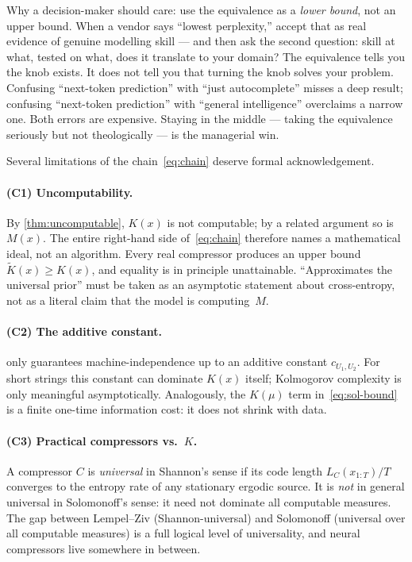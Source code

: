 \documentclass[12pt,a4paper]{article}
\theoremstyle{plain}
\theoremstyle{definition}
\begin{document}
\begin{intuition}
Why a decision-maker should care: use the equivalence as a
\emph{lower bound}, not an upper bound.  When a vendor says ``lowest
perplexity,'' accept that as real evidence of genuine modelling skill
--- and then ask the second question: skill at what, tested on what,
does it translate to your domain?  The equivalence tells you the knob
exists.  It does not tell you that turning the knob solves your
problem.  Confusing ``next-token prediction'' with ``just autocomplete''
misses a deep result; confusing ``next-token prediction'' with
``general intelligence'' overclaims a narrow one.  Both errors are
expensive.  Staying in the middle --- taking the equivalence seriously
but not theologically --- is the managerial win.
\end{intuition}

Several limitations of the chain~\eqref{eq:chain} deserve formal
acknowledgement.

\paragraph{(C1) Uncomputability.}
By \cref{thm:uncomputable}, $K(x)$ is not computable; by a related
argument so is $M(x)$.  The entire right-hand side of~\eqref{eq:chain}
therefore names a mathematical ideal, not an algorithm.  Every real
compressor produces an upper bound $\tilde K(x) \ge K(x)$, and
equality is in principle unattainable.  ``Approximates the universal
prior'' must be taken as an asymptotic statement about cross-entropy,
not as a literal claim that the model is computing~$M$.

\paragraph{(C2) The additive constant.}
 only guarantees machine-independence up to an
additive constant $c_{U_1, U_2}$.  For short strings this constant
can dominate $K(x)$ itself; Kolmogorov complexity is only meaningful
asymptotically.  Analogously, the $K(\mu)$ term in~\eqref{eq:sol-bound}
is a finite one-time information cost: it does not shrink with data.

\paragraph{(C3) Practical compressors vs.\ $K$.}
A compressor $C$ is \emph{universal} in Shannon's sense if its code
length $L_C(x_{1:T})/T$ converges to the entropy rate of any
stationary ergodic source.  It is \emph{not} in general universal in
Solomonoff's sense: it need not dominate all computable measures.  The
gap between Lempel--Ziv (Shannon-universal) and Solomonoff (universal
over all computable measures) is a full logical level of universality,
and neural compressors live somewhere in between.
\end{document}
